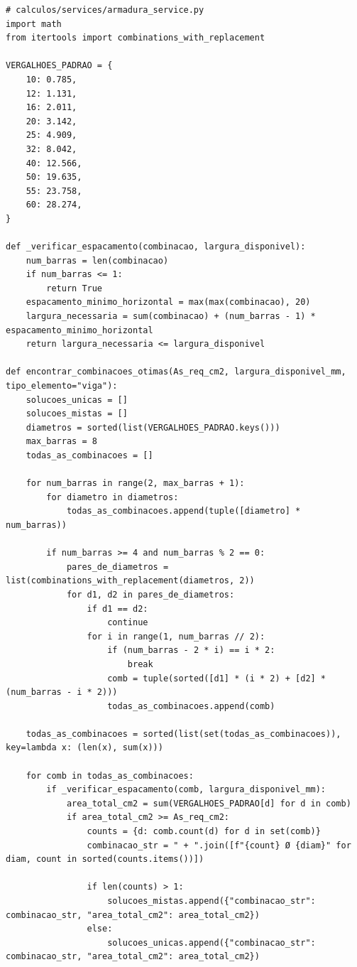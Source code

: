 \newpage
\begin{lstlisting}[style=PythonStyle, basicstyle=\ttfamily\normalsize, caption={Excerto de armadura\_service.py (Otimização de armaduras)}, label={lst:armadura_service}]
# calculos/services/armadura_service.py
import math
from itertools import combinations_with_replacement

VERGALHOES_PADRAO = {
    10: 0.785,
    12: 1.131,
    16: 2.011,
    20: 3.142,
    25: 4.909,
    32: 8.042,
    40: 12.566,
    50: 19.635,
    55: 23.758,
    60: 28.274,
}

def _verificar_espacamento(combinacao, largura_disponivel):
    num_barras = len(combinacao)
    if num_barras <= 1:
        return True
    espacamento_minimo_horizontal = max(max(combinacao), 20)
    largura_necessaria = sum(combinacao) + (num_barras - 1) * espacamento_minimo_horizontal
    return largura_necessaria <= largura_disponivel

def encontrar_combinacoes_otimas(As_req_cm2, largura_disponivel_mm, tipo_elemento="viga"):
    solucoes_unicas = []
    solucoes_mistas = []
    diametros = sorted(list(VERGALHOES_PADRAO.keys()))
    max_barras = 8
    todas_as_combinacoes = []

    for num_barras in range(2, max_barras + 1):
        for diametro in diametros:
            todas_as_combinacoes.append(tuple([diametro] * num_barras))

        if num_barras >= 4 and num_barras % 2 == 0:
            pares_de_diametros = list(combinations_with_replacement(diametros, 2))
            for d1, d2 in pares_de_diametros:
                if d1 == d2:
                    continue
                for i in range(1, num_barras // 2):
                    if (num_barras - 2 * i) == i * 2:
                        break
                    comb = tuple(sorted([d1] * (i * 2) + [d2] * (num_barras - i * 2)))
                    todas_as_combinacoes.append(comb)

    todas_as_combinacoes = sorted(list(set(todas_as_combinacoes)), key=lambda x: (len(x), sum(x)))

    for comb in todas_as_combinacoes:
        if _verificar_espacamento(comb, largura_disponivel_mm):
            area_total_cm2 = sum(VERGALHOES_PADRAO[d] for d in comb)
            if area_total_cm2 >= As_req_cm2:
                counts = {d: comb.count(d) for d in set(comb)}
                combinacao_str = " + ".join([f"{count} Ø {diam}" for diam, count in sorted(counts.items())])

                if len(counts) > 1:
                    solucoes_mistas.append({"combinacao_str": combinacao_str, "area_total_cm2": area_total_cm2})
                else:
                    solucoes_unicas.append({"combinacao_str": combinacao_str, "area_total_cm2": area_total_cm2})


\end{lstlisting}
